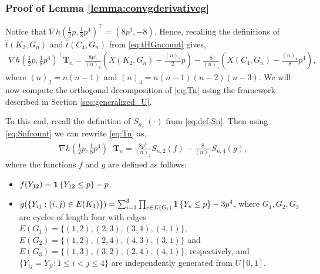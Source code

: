 \documentclass[11pt,reqno]{amsart}
\numberwithin{equation}{section}
\newcommand{\one}{{\bf 1}}
\theoremstyle{definition}
\begin{document}
\subsubsection{Proof of Lemma \ref{lemma:convgderivativeg}} 

Notice that $\nabla h(\tfrac{1}{2} p,\tfrac{1}{8} p^4)^{\top} = (8p^{3},-8)$. Hence, recalling the definitions of $\hat t(K_2, G_n)$ and $\hat t(C_4, G_n)$ from \eqref{eq:tHGncount} gives,
\begin{align}\label{eq:Tn}
    \nabla h(\tfrac{1}{2} p,\tfrac{1}{8} p^4)^{\top}\bm{T}_{n} = \frac{8p^{3}}{(n)_{2}}\left(X(K_{2}, G_n) - \frac{(n)_{2}}{2}p\right) - \frac{8}{(n)_{4}}\left(X(C_{4}, G_n) - \frac{(n)_{4}}{8}p^{4}\right) , 
\end{align} 
where $(n)_{2} = n(n-1)$ and $(n)_{4} = n(n-1)(n-2)(n-3)$. 
We will now compute the orthogonal decomposition of \eqref{eq:Tn} using the framework described in Section \ref{sec:generalized_U}. 

To this end, recall the definition of $S_{n,\cdot}(\cdot)$ from \eqref{eq:def-Sn}. Then using \eqref{eq:Snfcount} we can rewrite \eqref{eq:Tn} as, 
\begin{align}\label{eq:nablagTSn}
    \nabla h(\tfrac{1}{2} p,\tfrac{1}{8} p^4)^{\top}\bm{T}_{n} = \frac{8p^{3}}{(n)_{2}}S_{n,2}(f) - \frac{8}{(n)_{4}}S_{n,4}(g) , 
\end{align}
where the functions $f$ and $g$ are defined as follows: 
\begin{itemize}
\item   $f(Y_{12}) = \one\left\{Y_{12}\leq p\right\} - p$. 
\item $g(\{Y_{ij}: (i, j) \in E(K_4)\}) = \sum_{i=1}^{3}\prod_{e\in E(G_i)}\one\left\{Y_e\leq p\right\} - 3p^4$, 
where $G_1,G_2,G_3$ are cycles of length four with edges $E(G_1) = \{(1,2),(2,3),(3,4),(4,1)\}$, $E(G_2) = \{(1,2),(2,4),(4,3),(3,1)\}$ and $E(G_3) = \{(1,3),(3,2),(2,4),(4,1)\}$, respectively, and $\{Y_{ij} = Y_{ji}: 1\leq i<j\leq 4\}$ are independently generated from $U[0,1]$. 
\end{itemize} 
\end{document}
